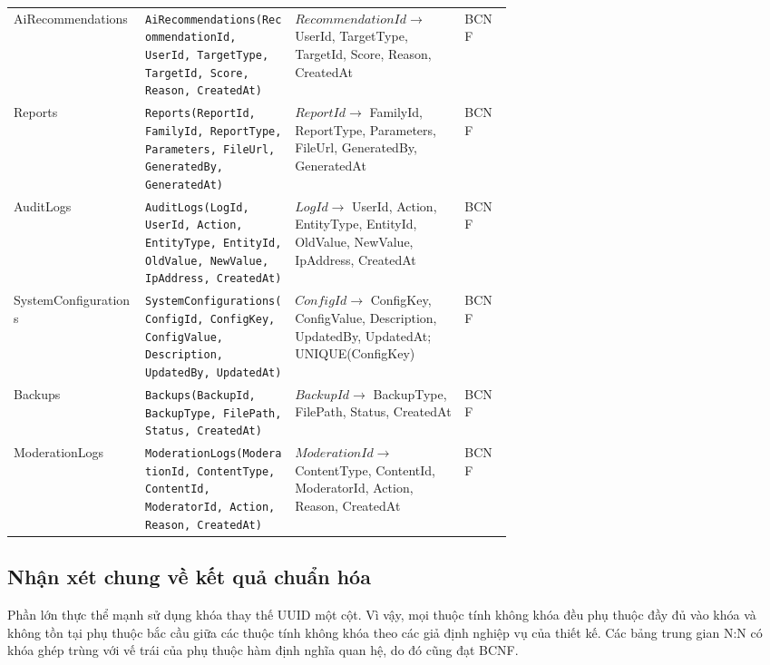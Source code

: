 \begin{center}
\begin{tabularx}{\linewidth}{@{}l>{\raggedright\arraybackslash}p{0.30\linewidth}>{\raggedright\arraybackslash}p{0.34\linewidth}l@{}}
AiRecommendations &
\texttt{AiRecommendations(RecommendationId, UserId, TargetType, TargetId, Score, Reason, CreatedAt)} &
$RecommendationId \rightarrow$ UserId, TargetType, TargetId, Score, Reason, CreatedAt &
BCNF \\

Reports &
\texttt{Reports(ReportId, FamilyId, ReportType, Parameters, FileUrl, GeneratedBy, GeneratedAt)} &
$ReportId \rightarrow$ FamilyId, ReportType, Parameters, FileUrl, GeneratedBy, GeneratedAt &
BCNF \\

AuditLogs &
\texttt{AuditLogs(LogId, UserId, Action, EntityType, EntityId, OldValue, NewValue, IpAddress, CreatedAt)} &
$LogId \rightarrow$ UserId, Action, EntityType, EntityId, OldValue, NewValue, IpAddress, CreatedAt &
BCNF \\

SystemConfigurations &
\texttt{SystemConfigurations(ConfigId, ConfigKey, ConfigValue, Description, UpdatedBy, UpdatedAt)} &
$ConfigId \rightarrow$ ConfigKey, ConfigValue, Description, UpdatedBy, UpdatedAt; UNIQUE(ConfigKey) &
BCNF \\

Backups &
\texttt{Backups(BackupId, BackupType, FilePath, Status, CreatedAt)} &
$BackupId \rightarrow$ BackupType, FilePath, Status, CreatedAt &
BCNF \\

ModerationLogs &
\texttt{ModerationLogs(ModerationId, ContentType, ContentId, ModeratorId, Action, Reason, CreatedAt)} &
$ModerationId \rightarrow$ ContentType, ContentId, ModeratorId, Action, Reason, CreatedAt &
BCNF \\

\bottomrule
\end{tabularx}
\end{center}

\subsection*{Nhận xét chung về kết quả chuẩn hóa}

Phần lớn thực thể mạnh sử dụng khóa thay thế UUID một cột. Vì vậy, mọi thuộc tính không khóa đều phụ thuộc đầy đủ vào khóa và không tồn tại phụ thuộc bắc cầu giữa các thuộc tính không khóa theo các giả định nghiệp vụ của thiết kế. Các bảng trung gian N:N có khóa ghép trùng với vế trái của phụ thuộc hàm định nghĩa quan hệ, do đó cũng đạt BCNF.


